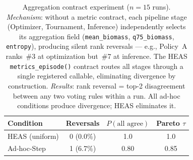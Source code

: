 \documentclass{wscpaperproc}
\begin{document}
\begin{table}[ht]
\centering\small
\caption{Aggregation contract experiment ($n\!=\!15$ runs). \emph{Mechanism}:
without a metric contract, each pipeline stage (Optimizer, Tournament,
Inference) independently selects its aggregation field
(\texttt{mean\_biomass}, \texttt{q75\_biomass}, \texttt{entropy}), producing
silent rank reversals — e.g., Policy~A ranks~\#3 at optimization but~\#7 at
inference. The HEAS \texttt{metrics\_episode()} contract routes all stages
through a single registered callable, eliminating divergence by construction.
\emph{Results}: rank reversal = top-2 disagreement between any two voting
rules within a run. All ad-hoc conditions produce divergence; HEAS eliminates it.}
\label{tab:agg-control}
\begin{tabular}{lccc}
\toprule
Condition & Reversals & $P(\text{all agree})$ & Pareto $\tau$ \\
\midrule
HEAS (uniform) & 0 (0.0\%) & 1.0 & 1.0 \\
Ad-hoc-Step    & 1 (6.7\%) & 0.80 & 0.85 \\
\bottomrule
\end{tabular}
\end{table}
\end{document}
